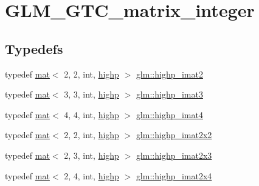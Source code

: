 \hypertarget{group__gtc__matrix__integer}{}\section{G\+L\+M\+\_\+\+G\+T\+C\+\_\+matrix\+\_\+integer}
\label{group__gtc__matrix__integer}
\subsection*{Typedefs}
\begin{DoxyCompactItemize}
\item 
typedef \mbox{\hyperlink{structglm_1_1mat}{mat}}$<$ 2, 2, int, \mbox{\hyperlink{namespaceglm_a36ed105b07c7746804d7fdc7cc90ff25ac6f7eab42eacbb10d59a58e95e362074}{highp}} $>$ \mbox{\hyperlink{group__gtc__matrix__integer_ga5b3d41917c60488d2babd72ca26d01ba}{glm\+::highp\+\_\+imat2}}
\item 
typedef \mbox{\hyperlink{structglm_1_1mat}{mat}}$<$ 3, 3, int, \mbox{\hyperlink{namespaceglm_a36ed105b07c7746804d7fdc7cc90ff25ac6f7eab42eacbb10d59a58e95e362074}{highp}} $>$ \mbox{\hyperlink{group__gtc__matrix__integer_ga3a8088cb8c764ec1c3719f31b3687ba8}{glm\+::highp\+\_\+imat3}}
\item 
typedef \mbox{\hyperlink{structglm_1_1mat}{mat}}$<$ 4, 4, int, \mbox{\hyperlink{namespaceglm_a36ed105b07c7746804d7fdc7cc90ff25ac6f7eab42eacbb10d59a58e95e362074}{highp}} $>$ \mbox{\hyperlink{group__gtc__matrix__integer_ga2f3fec7874f434d081a186d11ccbed3c}{glm\+::highp\+\_\+imat4}}
\item 
typedef \mbox{\hyperlink{structglm_1_1mat}{mat}}$<$ 2, 2, int, \mbox{\hyperlink{namespaceglm_a36ed105b07c7746804d7fdc7cc90ff25ac6f7eab42eacbb10d59a58e95e362074}{highp}} $>$ \mbox{\hyperlink{group__gtc__matrix__integer_ga9d5c6c5a4640f7c794a77e3f60b91670}{glm\+::highp\+\_\+imat2x2}}
\item 
typedef \mbox{\hyperlink{structglm_1_1mat}{mat}}$<$ 2, 3, int, \mbox{\hyperlink{namespaceglm_a36ed105b07c7746804d7fdc7cc90ff25ac6f7eab42eacbb10d59a58e95e362074}{highp}} $>$ \mbox{\hyperlink{group__gtc__matrix__integer_ga6bf015d7d01115e1d71362f2aa1cd3c4}{glm\+::highp\+\_\+imat2x3}}
\item 
typedef \mbox{\hyperlink{structglm_1_1mat}{mat}}$<$ 2, 4, int, \mbox{\hyperlink{namespaceglm_a36ed105b07c7746804d7fdc7cc90ff25ac6f7eab42eacbb10d59a58e95e362074}{highp}} $>$ \mbox{\hyperlink{group__gtc__matrix__integer_ga5e3a9d05895fbefef19c051e60ca81c4}{glm\+::highp\+\_\+imat2x4}}

\end{DoxyCompactItemize}
